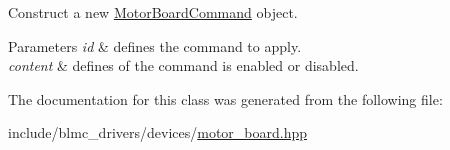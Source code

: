 Construct a new \hyperlink{classblmc__drivers_1_1MotorBoardCommand}{Motor\+Board\+Command} object. 


\begin{DoxyParams}{Parameters}
{\em id} & defines the command to apply. \\
\hline
{\em content} & defines of the command is enabled or disabled. \\
\hline
\end{DoxyParams}


The documentation for this class was generated from the following file\+:\begin{DoxyCompactItemize}
\item 
include/blmc\+\_\+drivers/devices/\hyperlink{motor__board_8hpp}{motor\+\_\+board.\+hpp}\end{DoxyCompactItemize}
